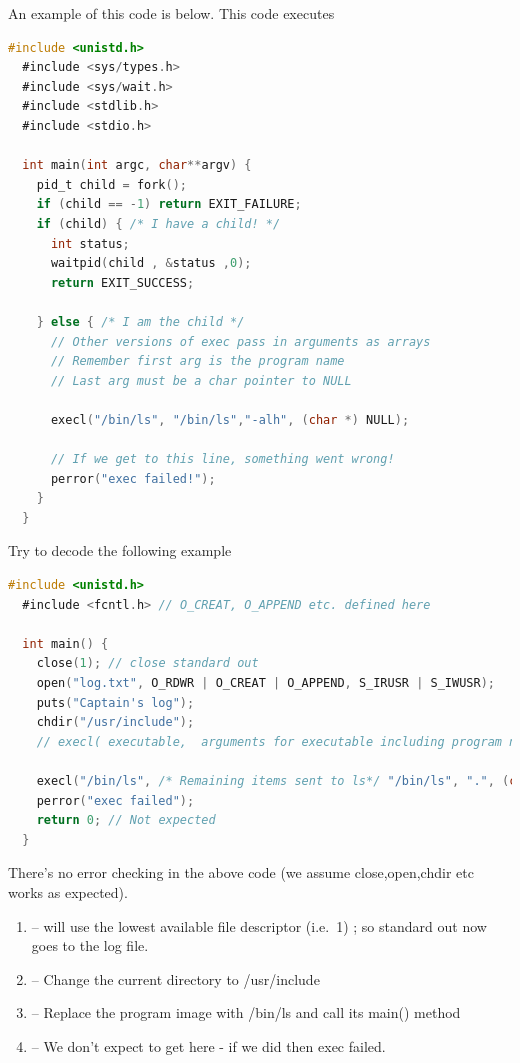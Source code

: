 An example of this code is below. This code executes 

\begin{lstlisting}[language=C]
  #include <unistd.h>
  #include <sys/types.h> 
  #include <sys/wait.h>
  #include <stdlib.h>
  #include <stdio.h>

  int main(int argc, char**argv) {
    pid_t child = fork();
    if (child == -1) return EXIT_FAILURE;
    if (child) { /* I have a child! */
      int status;
      waitpid(child , &status ,0);
      return EXIT_SUCCESS;

    } else { /* I am the child */
      // Other versions of exec pass in arguments as arrays
      // Remember first arg is the program name
      // Last arg must be a char pointer to NULL

      execl("/bin/ls", "/bin/ls","-alh", (char *) NULL);

      // If we get to this line, something went wrong!
      perror("exec failed!");
    }
  }
\end{lstlisting}

Try to decode the following example

\begin{lstlisting}[language=C]
  #include <unistd.h>
  #include <fcntl.h> // O_CREAT, O_APPEND etc. defined here

  int main() {
    close(1); // close standard out
    open("log.txt", O_RDWR | O_CREAT | O_APPEND, S_IRUSR | S_IWUSR);
    puts("Captain's log");
    chdir("/usr/include");
    // execl( executable,  arguments for executable including program name and NULL at the end)

    execl("/bin/ls", /* Remaining items sent to ls*/ "/bin/ls", ".", (char *) NULL); // "ls ."
    perror("exec failed");
    return 0; // Not expected
  }
\end{lstlisting}

There's no error checking in the above code (we assume close,open,chdir etc works as expected). 

\begin{enumerate}
\item {} -- will use the lowest available file descriptor (i.e.~1) ; so standard out now goes to the log file. 
\item {} -- Change the current directory to /usr/include 
\item {} -- Replace the program image with /bin/ls and call its main() method 
\item {} -- We don't expect to get here - if we did then exec failed.
\end{enumerate}


